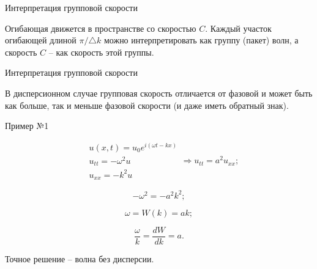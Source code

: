 \documentclass[10pt,xcolor=pst,aspectratio=169]{beamer}
\begin{document}
\begin{frame}{Интерпретация групповой скорости}

    \transdissolve[duration=0.1]
    \justifying
    \large

    \begin{center}
    \end{center}

    Огибающая движется в пространстве со скоростью $C$. Каждый участок огибающей длиной $\pi/\triangle k$ можно интерпретировать как группу (пакет) волн, а скорость $C$ -- как скорость этой группы. \\

\end{frame}

\begin{frame}{Интерпретация групповой скорости}

    \transdissolve[duration=0.1]
    \justifying
    \large

    \begin{center}
    \end{center}

    \begin{center}
    \end{center}

    В дисперсионном случае групповая скорость отличается от фазовой и может быть как больше, так и меньше фазовой скорости (и даже иметь обратный знак).

\end{frame}

\begin{frame}{Пример №1}

    \transdissolve[duration=0.1]
    \justifying
    \large

    \[
        \boxed{
            \begin{split}
                &u \left( x, t \right) = u_{0} e^{i \left( \omega t - k x \right)} \\
                &u_{tt} = - \omega^{2} u \\
                &u_{xx} = - k^{2} u
            \end{split}
        }
        \Rightarrow
        \boxed{
            u_{tt} = a^{2} u_{xx}
        };
    \]

    \[
        - \omega^{2} = - a^{2} k^{2};
    \]

    \[
        \omega = W \left( k \right) = a k;
    \]

    \[
        \frac{\omega}{k} = \frac{d W}{d k} = a.
    \]

    \begin{center}
        Точное решение -- волна без дисперсии.
    \end{center}

\end{frame}
\end{document}
